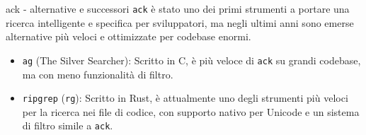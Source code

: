 \begin{frame}[fragile]{ack - alternative e successori}
  \texttt{ack} è stato uno dei primi strumenti a portare una ricerca intelligente e specifica per sviluppatori, ma negli ultimi anni sono emerse alternative più veloci e ottimizzate per codebase enormi.

  \begin{itemize}
	\item \texttt{ag} (The Silver Searcher): Scritto in C, è più veloce di \texttt{ack} su grandi codebase, ma con meno funzionalità di filtro.
	\item \texttt{ripgrep} (\texttt{rg}): Scritto in Rust, è attualmente uno degli strumenti più veloci per la ricerca nei file di codice, con supporto nativo per Unicode e un sistema di filtro simile a \texttt{ack}.
  \end{itemize}
\end{frame}
